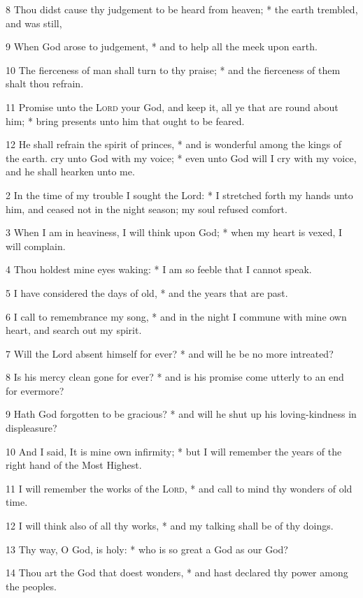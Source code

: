 8 Thou didst cause thy judgement to be heard from heaven; * the earth trembled, and was still,\par
9 When God arose to judgement, * and to help all the meek upon earth.\par
10 The fierceness of man shall turn to thy praise; * and the fierceness of them shalt thou refrain.\par
11 Promise unto the {\textsc{Lord}} your God, and keep it, all ye that are round about him; * bring presents unto him that ought to be feared.\par
12 He shall refrain the spirit of princes, * and is wonderful among the kings of the earth.
 cry unto God with my voice; * even unto God will I cry with my voice, and he shall hearken unto me.\par
2 In the time of my trouble I sought the Lord: * I stretched forth my hands unto him, and ceased not in the night season; my soul refused comfort.\par
3 When I am in heaviness, I will think upon God; * when my heart is vexed, I will complain.\par
4 Thou holdest mine eyes waking: * I am so feeble that I cannot speak.\par
5 I have considered the days of old, * and the years that are past.\par
6 I call to remembrance my song, * and in the night I commune with mine own heart, and search out my spirit.\par
7 Will the Lord absent himself for ever? * and will he be no more intreated?\par
8 Is his mercy clean gone for ever? * and is his promise come utterly to an end for evermore?\par
9 Hath God forgotten to be gracious? * and will he shut up his loving-kindness in displeasure?\par
10 And I said, It is mine own infirmity; * but I will remember the years of the right hand of the Most Highest.\par
11 I will remember the works of the {\textsc{Lord}}, * and call to mind thy wonders of old time.\par
12 I will think also of all thy works, * and my talking shall be of thy doings.\par
13 Thy way, O God, is holy: * who is so great a God as our God?\par
14 Thou art the God that doest wonders, * and hast declared thy power among the peoples.\par
